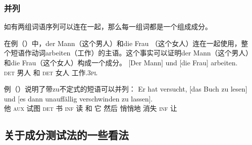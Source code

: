 \subsubsection{并列}

如有两组词语序列可以连在一起，那么每一组词都是一个组成成分。

在例（）中，der Mann（这个男人）和die Frau （这个女人）连在一起使用，整个短语作动词arbeiten（工作）的主语。这个事实可以证明der Mann（这个男人）和die Frau（这个女人）构成一个成分。
\ea
\gll {}[Der        Mann] und [die          Frau] arbeiten.\\
     \spacebr{}\textsc{det} 男人   和 \spacebr{}\textsc{det} 女人 工作.\textsc{3pl}\\
\z

例（）说明了带zu不定式的短语可以并列：
\ea
\gll Er hat versucht, [das Buch zu lesen] und [es dann unauffällig verschwinden zu lassen].\\
     他 \textsc{aux} 试图 \spacebr{}\textsc{det} 书 \textsc{inf} 读 和 \spacebr{}它 然后 悄悄地 消失 \textsc{inf} 让\\
\z

\subsection{关于成分测试法的一些看法}
\label{sec-status-der-ktests}

